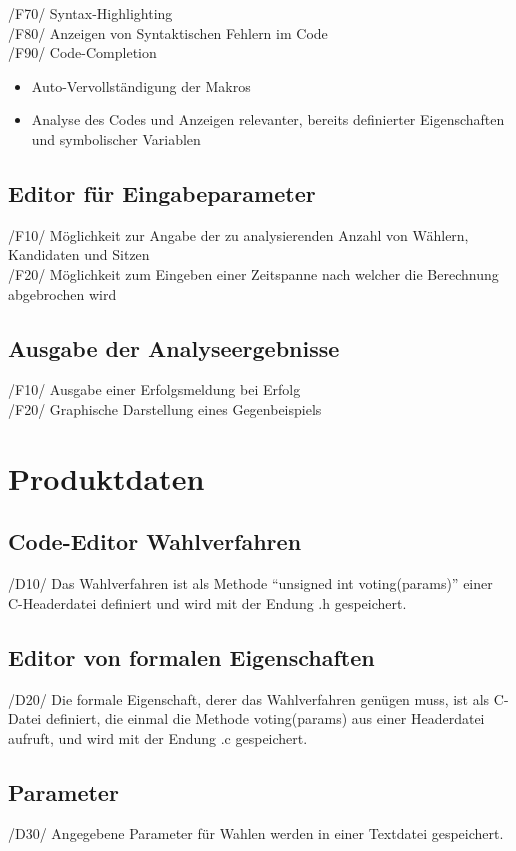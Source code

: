 \documentclass[a4paper]{scrreprt}
\begin{document}
/F70/ Syntax-Highlighting \\
/F80/ Anzeigen von Syntaktischen Fehlern im Code \\
/F90/ Code-Completion
\begin{itemize}
\item Auto-Vervollständigung der Makros
\item Analyse des Codes und Anzeigen relevanter, bereits definierter Eigenschaften und symbolischer Variablen
\end{itemize}

\section{Editor für Eingabeparameter}
/F10/ Möglichkeit zur Angabe der zu analysierenden Anzahl von Wählern, Kandidaten und Sitzen \\
/F20/ Möglichkeit zum Eingeben einer Zeitspanne nach welcher die Berechnung abgebrochen wird \\

\section{Ausgabe der Analyseergebnisse}
/F10/ Ausgabe einer Erfolgsmeldung bei Erfolg \\
/F20/ Graphische Darstellung eines Gegenbeispiels \\

\chapter{Produktdaten}
\section{Code-Editor Wahlverfahren}
/D10/ Das Wahlverfahren ist als Methode "`unsigned int voting(params)"' einer C-Headerdatei definiert und wird mit der Endung .h gespeichert.

\section{Editor von formalen Eigenschaften}
/D20/ Die formale Eigenschaft, derer das Wahlverfahren genügen muss, ist als C-Datei definiert, die einmal die Methode voting(params) aus einer Headerdatei aufruft, und wird mit der Endung .c gespeichert.

\section{Parameter}
/D30/ Angegebene Parameter für Wahlen werden in einer Textdatei gespeichert.
\end{document}

